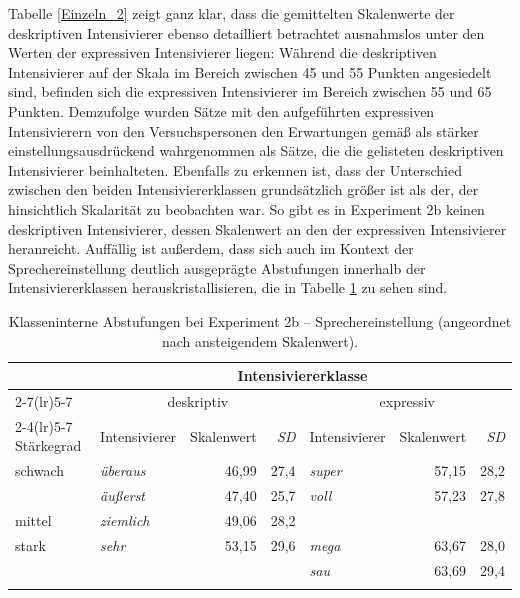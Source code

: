 \noindent Tabelle \ref{Einzeln_2} zeigt ganz klar, dass die gemittelten Skalenwerte der deskriptiven Intensivierer ebenso detailliert betrachtet ausnahmslos unter den Werten der expressiven Intensivierer liegen: Während die deskriptiven Intensivierer auf der Skala im Bereich zwischen 45 und 55 Punkten angesiedelt sind, befinden sich die expressiven Intensivierer im Bereich zwischen 55 und 65 Punkten. Demzufolge wurden Sätze mit den aufgeführten expressiven Intensivierern von den Versuchspersonen den Erwartungen gemäß als stärker einstellungsausdrückend wahrgenommen als Sätze, die die gelisteten deskriptiven Intensivierer beinhalteten. Ebenfalls zu erkennen ist, dass der Unterschied zwischen den beiden Intensiviererklassen grundsätzlich größer ist als der, der hinsichtlich Skalarität zu beobachten war. So gibt es in {Experiment 2b} keinen deskriptiven Intensivierer, dessen Skalenwert an den der expressiven Intensivierer heranreicht. Auffällig ist außerdem, dass sich auch im Kontext der Sprechereinstellung deutlich ausgeprägte Abstufungen innerhalb der Intensiviererklassen herauskristallisieren, die in {Tabelle \ref{stark}} zu sehen sind.


\begin{table}
\small
\begin{tabularx}{\textwidth}{X@{} lrr lrr }
\lsptoprule
 &  \multicolumn{6}{c}{\textbf{Intensiviererklasse}}  \\
\cmidrule(lr){2-7}\cmidrule(lr){5-7}
& \multicolumn{3}{c}{{deskriptiv}} & \multicolumn{3}{c}{{expressiv}}  \\
\cmidrule(lr){2-4}\cmidrule(lr){5-7}
{Stärkegrad}  & Intensivierer & Skalenwert& \textit{SD}  & Intensivierer & Skalenwert& \textit{SD}   \\
\midrule
schwach & \textit{überaus} & 46,99& 27,4 & \textit{super} &  57,15 & 28,2 \\
 & \textit{äußerst} & 47,40 & 25,7 & \textit{voll} & 57,23& 27,8   \\
\multicolumn{1}{l}{mittel} & \textit{ziemlich} & 49,06& 28,2 &  &  \\
\multicolumn{1}{l}{stark} & \textit{sehr} & 53,15& 29,6  & \textit{mega} & 63,67 & 28,0\\
\multicolumn{1}{l}{} & \textit{} & &   & \textit{sau} & 63,69& 29,4 \\
\lspbottomrule

\end{tabularx}
\caption[Klasseninterne Abstufungen bei Experiment 2b]{Klasseninterne Abstufungen bei Experiment 2b -- Sprechereinstellung (angeordnet nach ansteigendem Skalenwert).}
\label{stark}
\end{table}


